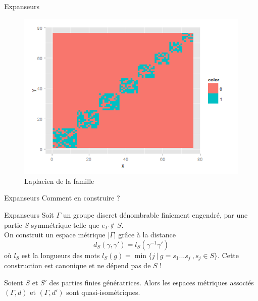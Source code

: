 \begin{frame}{Expanseurs}
\begin{figure}\includegraphics[scale=0.45]{Laplacian.png}\caption{Laplacien de la famille}\end{figure}
\end{frame}

\begin{frame}{Expanseurs}
Comment en construire ?
\end{frame}

\begin{frame}{Expanseurs} %
Soit $\Gamma$ un groupe discret dénombrable finiement engendré, par une partie $S$ symmétrique telle que $e_\Gamma\not\in S $.\\
On construit un espace métrique $|\Gamma|$ grâce à la distance 
\[d_S(\gamma,\gamma')=l_S(\gamma^{-1}\gamma')\]
où $l_S$ est la longueurs des mots $l_S(g) = \min \{j \ |\ g=s_1 ...s_j \ , s_j\in S\}$.
Cette construction est canonique et ne dépend pas de $S$ !
\begin{thm}
Soient $S$ et $S'$ des parties finies génératrices. Alors les espaces métriques associés $(\Gamma,d)$ et $(\Gamma,d')$ sont quasi-isométriques.
\end{thm}
\end{frame}

